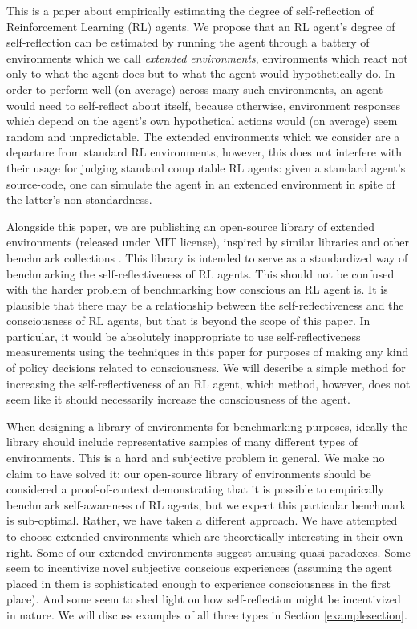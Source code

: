 \documentclass{article}
\begin{document}
This is a paper about empirically estimating the degree of self-reflection of
Reinforcement Learning (RL) agents. We propose that an RL agent's degree of self-reflection
can be estimated by running the agent through a battery of environments which we call
\emph{extended environments}, environments which react not only to what the agent does
but to what the agent would hypothetically do. In order to perform well (on average)
across many such environments, an agent would need to self-reflect about itself, because
otherwise, environment responses which depend on the agent's own hypothetical actions
would (on average) seem random and unpredictable. The extended environments which we
consider are a departure from standard RL environments, however, this does not interfere
with their usage for judging standard computable RL agents: given a standard agent's
source-code, one can simulate the agent in an extended environment in spite of the
latter's non-standardness.

Alongside this paper, we are publishing an open-source library of extended
environments (released under MIT license),
inspired by similar libraries and other benchmark collections
\cite{bellemare2013arcade}
\cite{beyret2019animal} \cite{brockman2016openai} \cite{chollet2019measure}
\cite{cobbe2020leveraging}.
This library is intended to serve as a standardized way of
benchmarking the self-reflectiveness of RL agents. This should not be confused
with the harder problem of benchmarking how conscious an RL agent is. It is
plausible that there may be a relationship between the self-reflectiveness and
the consciousness of RL agents, but that is beyond the scope of this paper.
In particular, it would be absolutely inappropriate to use self-reflectiveness
measurements using the techniques in this paper for purposes of making any kind
of policy decisions related to consciousness.
We will describe
a simple method for increasing the self-reflectiveness of an RL agent, which method,
however, does not seem like it should necessarily increase the consciousness of
the agent.

When designing a library of environments for benchmarking purposes, ideally the
library should include representative samples of many different types of
environments. This is a hard and subjective problem in general. We make no claim to have solved
it: our open-source library of environments should be considered a proof-of-context
demonstrating that it is possible to empirically benchmark self-awareness of RL
agents, but we expect this particular benchmark is sub-optimal.
Rather, we have taken a different approach.
We have attempted to choose extended environments which are theoretically
interesting in their own right. Some of our extended environments
suggest amusing quasi-paradoxes. Some seem to incentivize novel subjective conscious
experiences (assuming the agent placed in them is sophisticated enough to experience
consciousness in the first place). And some seem to shed light on how self-reflection
might be incentivized in nature. We will discuss examples of all three types in
Section \ref{examplesection}.
\end{document}
